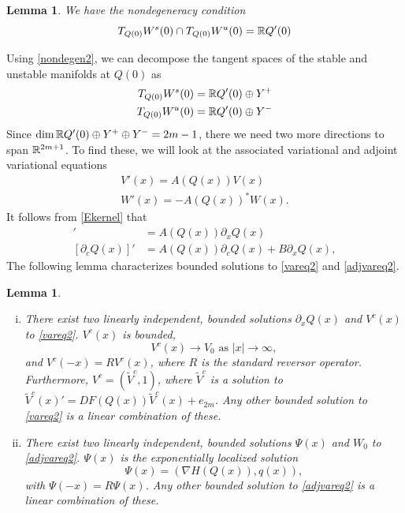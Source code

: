 \documentclass[10pt,reqno]{amsart}
\theoremstyle{plain}
\newtheorem{lemma}[theorem]{Lemma}
\theoremstyle{definition}
\theoremstyle{remark}
\numberwithin{theorem}{section}
\numberwithin{equation}{section}
\begin{document}
\begin{lemma}\label{nondegenlemma}
We have the nondegeneracy condition
\begin{equation}\label{nondegen2}
T_{Q(0)}W^s(0) \cap T_{Q(0)}W^u(0) = \mathbb{R} Q'(0)
\end{equation}
\end{lemma}
\noi Using \cref{nondegen2}, we can decompose the tangent spaces of the stable and unstable manifolds at $Q(0)$ as
\begin{equation}\label{TQ0decomp}
\begin{aligned}
T_{Q(0)}W^s(0) &= \mathbb{R} Q'(0) \oplus Y^+ \\
T_{Q(0)}W^u(0) &= \mathbb{R} Q'(0) \oplus Y^-
\end{aligned}
\end{equation}
Since $\mathop\mathrm{dim}\nolimits \mathbb{R} Q'(0) \oplus Y^+ \oplus Y^- = 2m-1$, there we need two more directions to span $\mathbb{R}^{2m+1}$. To find these, we will look at the associated variational and adjoint variational equations
\begin{align}
V'(x) = A(Q(x)) V(x) \label{vareq2} \\
W'(x) = -A(Q(x))^* W(x) \label{adjvareq2}.
\end{align}
It follows from \cref{Ekernel} that 
\begin{align}
[\partial_x Q(x)]' &= A(Q(x))\partial_x Q(x) \label{Qprimevarsol} \\
[\partial_c Q(x)]' &= A(Q(x))\partial_c Q(x) + B \partial_x Q(x), \label{Qcvarsol}
\end{align}
The following lemma characterizes bounded solutions to \eqref{vareq2} and \eqref{adjvareq2}.

\begin{lemma}\label{varadjsolutions}\leavevmode
\begin{enumerate}[(i)]
	\item There exist two linearly independent, bounded solutions $\partial_x Q(x)$ and $V^c(x)$ to \eqref{vareq2}. $V^c(x)$ is bounded,
	\begin{equation}
	V^c(x) \rightarrow V_0 \text{ as }|x| \rightarrow \infty,
	\end{equation}
	and	$V^c(-x) = R V^c(x)$, where $R$ is the standard reversor operator. Furthermore, $V^c = (\tilde{V}^c, 1)$, where $\tilde{V}^c$ is a solution to $\tilde{V}^c(x)' = DF(Q(x)) \tilde{V}^c(x) + e_{2m}$. Any other bounded solution to \eqref{vareq2} is a linear combination of these.

	\item There exist two linearly independent, bounded solutions $\Psi(x)$ and $W_0$ to \eqref{adjvareq2}. $\Psi(x)$ is the exponentially localized solution
	\begin{equation}\label{psicomponents}
	\Psi(x) = (\nabla H(Q(x)), q(x)), 
	\end{equation}
	with $\Psi(-x) = R \Psi(x)$. Any other bounded solution to \eqref{adjvareq2} is a linear combination of these.
\end{enumerate}
\end{lemma}
\end{document}
